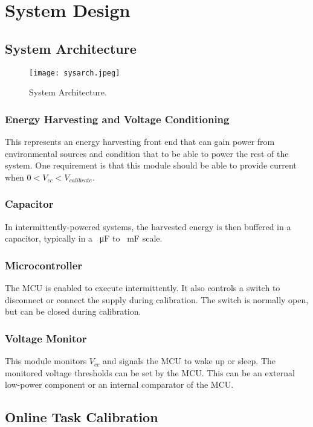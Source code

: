 \section{System Design}

\subsection{System Architecture}

\begin{figure}[!h]
    \centering
    \texttt{[image: sysarch.jpeg]}
    \caption{System Architecture.}
    \label{fig:sysarch}
\end{figure}

\subsubsection{Energy Harvesting and Voltage Conditioning} 
This represents an energy harvesting front end that can gain power from environmental sources and condition that to be able to power the rest of the system. 
One requirement is that this module should be able to provide current when $0 < V_{cc} < V_{calibrate}$.

\subsubsection{Capacitor} 
In intermittently-powered systems, the harvested energy is then buffered in a capacitor, typically in a \SI{}{\micro\farad} to \SI{}{\milli\farad} scale. 

\subsubsection{Microcontroller}
The MCU is enabled to execute intermittently. It also controls a switch to disconnect or connect the supply during calibration. 
The switch is normally open, but can be closed during calibration. 

\subsubsection{Voltage Monitor}
This module monitors $V_{cc}$ and signals the MCU to wake up or sleep. 
The monitored voltage thresholds can be set by the MCU. 
This can be an external low-power component or an internal comparator of the MCU. 

\subsection{Online Task Calibration}

